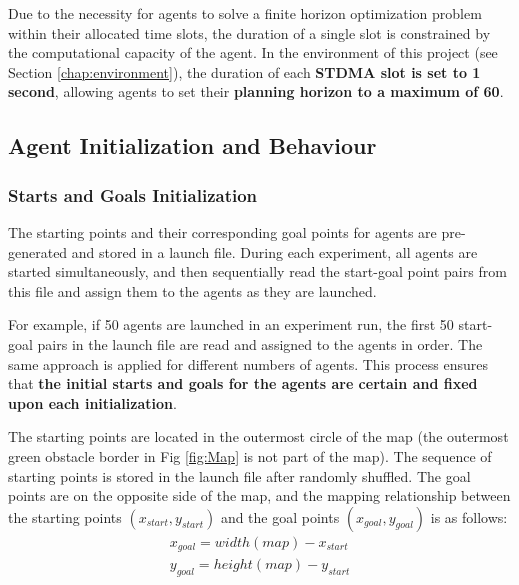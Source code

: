 Due to the necessity for agents to solve a finite horizon optimization problem within their allocated time slots, the duration of a single slot is constrained by the computational capacity of the agent.
In the environment of this project (see Section \ref{chap:environment}), the duration of each \textbf{STDMA slot is set to  1 second}, allowing agents to set their \textbf{planning horizon to a maximum of 60}.

\subsection*{Agent Initialization and Behaviour}
\label{chap:agent initialisation}
\subsubsection{Starts and Goals Initialization}
The starting points and their corresponding goal points for agents are pre-generated and stored in a launch file. 
During each experiment, all agents are started simultaneously, and then sequentially read the start-goal point pairs from this file and assign them to the agents as they are launched.

For example, if 50 agents are launched in an experiment run, the first 50 start-goal pairs in the launch file are read and assigned to the agents in order. The same approach is applied for different numbers of agents.
This process ensures that \textbf{the initial starts and goals for the agents are certain and fixed upon each initialization}.

The starting points are located in the outermost circle of the map (the outermost green obstacle border in Fig \ref{fig:Map} is not part of the map). 
The sequence of starting points is stored in the launch file after randomly shuffled.
The goal points are on the opposite side of the map, and the mapping relationship between the starting points $(x_{start}, y_{start})$ and the goal points $(x_{goal}, y_{goal})$ is as follows:
\begin{align}
    x_{goal} = width(map) - x_{start}  \\
    y_{goal} = height(map) - y_{start} 
\end{align}

